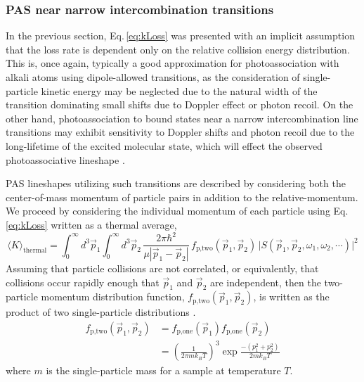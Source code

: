 \subsubsection{PAS near narrow intercombination transitions} \label{sssec:narrow_pa}
In the previous section, Eq.\,\ref{eq:kLoss} was presented with an implicit assumption that the loss rate is dependent only on the relative collision energy distribution.
This is, once again, typically a good approximation for photoassociation with alkali atoms using dipole-allowed transitions, as the consideration of single-particle kinetic energy may be neglected due to the natural width of the transition dominating small shifts due to Doppler effect or photon recoil.
On the other hand, photoassociation to bound states near a narrow intercombination line transitions may exhibit sensitivity to Doppler shifts and photon recoil due to the long-lifetime of the excited molecular state, which will effect the observed photoassociative lineshape \cite{Ciuryo2004, Borkowski2014a, Nicholson2015a, Reschovsky2018, Pachomov2017}.

PAS lineshapes utilizing such transitions are described by considering both the center-of-mass momentum of particle pairs in addition to the relative-momentum.
We proceed by considering the individual momentum of each particle using Eq.\,\ref{eq:kLoss} written as a thermal average,
\begin{equation} \label{eq:onePasMom}
	 \langle K \rangle_\text{thermal} = \int_0^{\infty} d^3\vec{p}_1 \int_0^{\infty} d^3\vec{p}_2 \,\frac{2 \pi \hbar^2}{\mu |\vec{p}_1 - \vec{p}_2|} \, f_\text{p,two}( \vec{p}_1, \vec{p}_2 ) \, \vert  S(\vec{p}_1, \vec{p}_2, \omega_1, \omega_2, \cdots) \vert^2  
\end{equation}
Assuming that particle collisions are not correlated, or equivalently, that collisions occur rapidly enough that $\vec{p}_1$ and $\vec{p}_2$ are independent, then the two-particle momentum distribution function, $f_\text{p,two}( \vec{p}_1, \vec{p}_2 )$, is written as the product of two single-particle distributions \cite{Ehrenfest2015,Chliamovitch2017,Brown2008}. 
\begin{equation} \label{eq:3two_particle_prob}
\begin{split}
		 f_\text{p,two}( \vec{p}_1, \vec{p}_2 ) &= f_\text{p,one}( \vec{p}_1 ) f_\text{p,one}( \vec{p}_2 ) \\
		  &= \left(\frac{1}{2 \pi m k_B T}\right)^3 \exp{\frac{-(p_1^2 + p_2^2)}{2 m k_B T}}
\end{split}
\end{equation}
where $m$ is the single-particle mass for a sample at temperature $T$.

